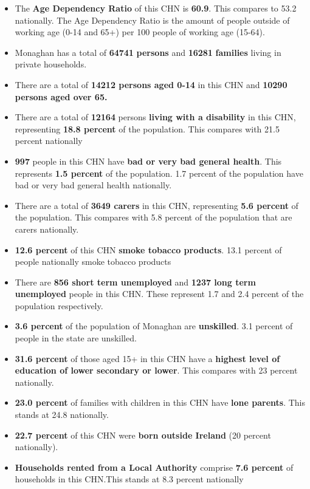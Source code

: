 \documentclass{article}
\begin{document}
\begin{itemize}

\item The \textbf{Age Dependency Ratio} of this CHN is  \textbf{60.9}. This compares to 53.2 nationally. The Age Dependency Ratio is the amount of people outside of working age (0-14 and 65+) per 100 people of working age (15-64). 

\item Monaghan has a total of \textbf{\num{64741}} \textbf{persons} and  \textbf{\num{16281}} \textbf{families} living in private households.

\item There are a total of \textbf{\num{14212} persons aged 0-14} in this CHN and \textbf{\num{10290} persons aged over 65.} 

\item There are a total of \textbf{\num{12164}} persons \textbf{living with a disability} in this CHN, representing \textbf{18.8 percent} of the population. This compares with  21.5 percent nationally

\item \textbf{\num{997}} people in this CHN have \textbf{bad or very bad general health}. This represents \textbf{1.5 percent} of the population. 1.7 percent of the population have bad or very bad general health nationally. 

\item There are a total of \textbf{\num{3649} carers} in this CHN, representing \textbf{5.6 percent} of the population. This compares with 5.8 percent of the population that are carers nationally. 

\item \textbf{12.6 percent} of this CHN \textbf{smoke tobacco products}. 13.1 percent of people nationally smoke tobacco products

\item There are \textbf{\num{856} short term unemployed} and \textbf{\num{1237} long term unemployed} people in this CHN. These represent 1.7 and 2.4 percent of the population respectively.

\item  \textbf{3.6 percent} of the population of Monaghan are \textbf{unskilled}. 3.1 percent of people in the state are unskilled.

\item \textbf{31.6 percent} of those aged 15+ in this CHN have a \textbf{highest level of education of lower secondary or lower}. This compares with 23 percent nationally. 

\item \textbf{23.0 percent} of families with children in this CHN have \textbf{lone parents}. This stands at 24.8 nationally.

\item \textbf{22.7 percent} of this CHN were \textbf{born outside Ireland} (20 percent nationally).

\item \textbf{Households rented from a Local Authority} comprise \textbf{7.6 percent} of households in this CHN.This stands at 8.3 percent nationally

\end{itemize}
\end{document}
